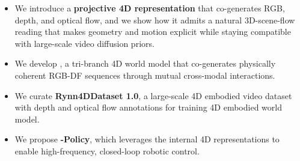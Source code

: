 \begin{itemize}[labelsep=0.6em, leftmargin=1.2em,itemindent=0em]
\item We introduce a \textbf{projective 4D representation} that co-generates RGB, depth, and optical flow, and we show how it admits a natural 3D-scene-flow reading that makes geometry and motion explicit while staying compatible with large-scale video diffusion priors.
\item We develop \textbf{\our}, a tri-branch 4D world model that co-generates physically coherent RGB-DF sequences through mutual cross-modal interactions.
\item We curate \textbf{Rynn4DDataset 1.0}, a large-scale 4D embodied video dataset with depth and optical flow annotations for training 4D embodied world model.
\item We propose \textbf{\our-Policy}, which leverages the internal 4D representations to enable high-frequency, closed-loop robotic control. 
\end{itemize}


